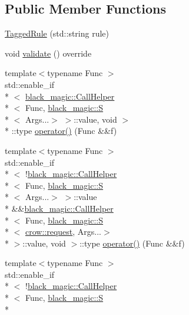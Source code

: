 \subsection*{Public Member Functions}
\begin{DoxyCompactItemize}
\item 
\hyperlink{classcrow_1_1_tagged_rule_a058a079101cee2bcc5936c785c6c76f6}{Tagged\-Rule} (std\-::string rule)
\item 
void \hyperlink{classcrow_1_1_tagged_rule_aafb046bbb0f1b47c1d56bfae72ef390a}{validate} () override
\item 
{\footnotesize template$<$typename Func $>$ }\\std\-::enable\-\_\-if\\*
$<$ \hyperlink{structcrow_1_1black__magic_1_1_call_helper}{black\-\_\-magic\-::\-Call\-Helper}\\*
$<$ Func, \hyperlink{structcrow_1_1black__magic_1_1_s}{black\-\_\-magic\-::\-S}\\*
$<$ Args...$>$ $>$\-::value, void $>$\\*
\-::type \hyperlink{classcrow_1_1_tagged_rule_a578c5809e9b533b496a6a6eab0d1929c}{operator()} (Func \&\&f)
\item 
{\footnotesize template$<$typename Func $>$ }\\std\-::enable\-\_\-if\\*
$<$ !\hyperlink{structcrow_1_1black__magic_1_1_call_helper}{black\-\_\-magic\-::\-Call\-Helper}\\*
$<$ Func, \hyperlink{structcrow_1_1black__magic_1_1_s}{black\-\_\-magic\-::\-S}\\*
$<$ Args...$>$ $>$\-::value \\*
\&\&\hyperlink{structcrow_1_1black__magic_1_1_call_helper}{black\-\_\-magic\-::\-Call\-Helper}\\*
$<$ Func, \hyperlink{structcrow_1_1black__magic_1_1_s}{black\-\_\-magic\-::\-S}\\*
$<$ \hyperlink{structcrow_1_1request}{crow\-::request}, Args...$>$\\*
 $>$\-::value, void $>$\-::type \hyperlink{classcrow_1_1_tagged_rule_a9d799cbc205754526437946405794712}{operator()} (Func \&\&f)
\item 
{\footnotesize template$<$typename Func $>$ }\\std\-::enable\-\_\-if\\*
$<$ !\hyperlink{structcrow_1_1black__magic_1_1_call_helper}{black\-\_\-magic\-::\-Call\-Helper}\\*
$<$ Func, \hyperlink{structcrow_1_1black__magic_1_1_s}{black\-\_\-magic\-::\-S}\\*

\end{DoxyCompactItemize}
